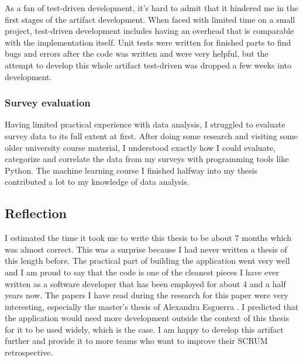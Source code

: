 As a fan of test-driven development, it's hard to admit that it hindered me in the first stages of the artifact development.
When faced with limited time on a small project, test-driven development includes having an overhead that is comparable with the implementation itself.
Unit tests were written for finished parts to find bugs and errors after the code was written and were very helpful, but the attempt to develop this whole artifact test-driven was dropped a few weeks into development.

\subsubsection*{Survey evaluation}

Having limited practical experience with data analysis, I struggled to evaluate survey data to its full extent at first.
After doing some research and visiting some older university course material, I understood exactly how I could evaluate, categorize and correlate
the data from my surveys with programming tools like Python. The machine learning course I finished halfway into my thesis contributed a lot to my knowledge of data analysis.


\subsection{Reflection}

I estimated the time it took me to write this thesis to be about 7 months which was almost correct. 
This was a surprise because I had never written a thesis of this length before. 
The practical part of building the application went very well and I am proud to say that the code 
is one of the cleanest pieces I have ever written as a software developer that has been employed for about 4 and a half years now.
The papers I have read during the research for this paper were very interesting, especially the master's thesis of Alexandra Esguerra \parencite{AgileProjectHealthIndicatorsThesis}.
I predicted that the application would need more development outside the context of this thesis for it to be used widely, which is the case.
I am happy to develop this artifact further and provide it to more teams who want to improve their SCRUM retrospective.
